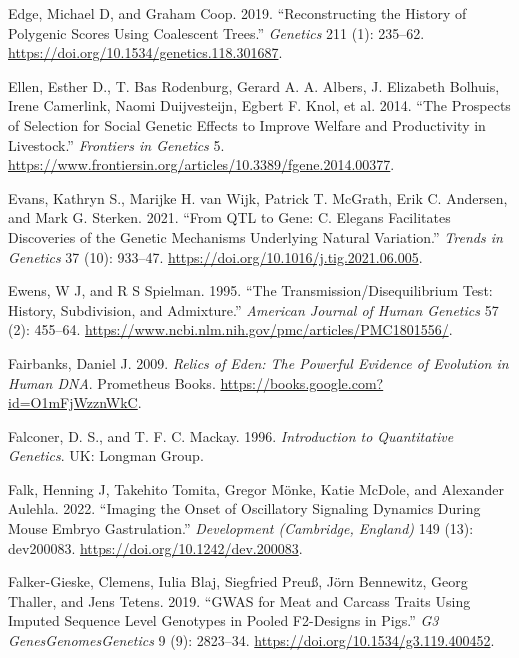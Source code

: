 \documentclass[
]{book}
\newlength{\cslhangindent}
\newlength{\cslentryspacingunit} %
\newenvironment{CSLReferences}[2] %
 {%
  \setlength{\parindent}{0pt}
  \ifodd #1
  \let\oldpar\par
  \def\par{\hangindent=\cslhangindent\oldpar}
  \fi
  \setlength{\parskip}{#2\cslentryspacingunit}
 }%
 {}
\begin{document}
\begin{CSLReferences}{1}{0}
\leavevmode{}%
Edge, Michael D, and Graham Coop. 2019. {``Reconstructing the {History} of {Polygenic Scores Using Coalescent Trees}.''} \emph{Genetics} 211 (1): 235--62. \url{https://doi.org/10.1534/genetics.118.301687}.

\leavevmode{}%
Ellen, Esther D., T. Bas Rodenburg, Gerard A. A. Albers, J. Elizabeth Bolhuis, Irene Camerlink, Naomi Duijvesteijn, Egbert F. Knol, et al. 2014. {``The Prospects of Selection for Social Genetic Effects to Improve Welfare and Productivity in Livestock.''} \emph{Frontiers in Genetics} 5. \url{https://www.frontiersin.org/articles/10.3389/fgene.2014.00377}.

\leavevmode{}%
Evans, Kathryn S., Marijke H. van Wijk, Patrick T. McGrath, Erik C. Andersen, and Mark G. Sterken. 2021. {``From {QTL} to Gene: {C}. Elegans Facilitates Discoveries of the Genetic Mechanisms Underlying Natural Variation.''} \emph{Trends in Genetics} 37 (10): 933--47. \url{https://doi.org/10.1016/j.tig.2021.06.005}.

\leavevmode{}%
Ewens, W J, and R S Spielman. 1995. {``The Transmission/Disequilibrium Test: History, Subdivision, and Admixture.''} \emph{American Journal of Human Genetics} 57 (2): 455--64. \url{https://www.ncbi.nlm.nih.gov/pmc/articles/PMC1801556/}.

\leavevmode{}%
Fairbanks, Daniel J. 2009. \emph{Relics of {Eden}: {The Powerful Evidence} of {Evolution} in {Human DNA}}. {Prometheus Books}. \url{https://books.google.com?id=O1mFjWzznWkC}.

\leavevmode{}%
Falconer, D. S., and T. F. C. Mackay. 1996. \emph{Introduction to Quantitative Genetics}. {UK: Longman Group}.

\leavevmode{}%
Falk, Henning J, Takehito Tomita, Gregor Mönke, Katie McDole, and Alexander Aulehla. 2022. {``Imaging the Onset of Oscillatory Signaling Dynamics During Mouse Embryo Gastrulation.''} \emph{Development (Cambridge, England)} 149 (13): dev200083. \url{https://doi.org/10.1242/dev.200083}.

\leavevmode{}%
Falker-Gieske, Clemens, Iulia Blaj, Siegfried Preuß, Jörn Bennewitz, Georg Thaller, and Jens Tetens. 2019. {``{GWAS} for {Meat} and {Carcass Traits Using Imputed Sequence Level Genotypes} in {Pooled F2-Designs} in {Pigs}.''} \emph{G3 Genes\textbar Genomes\textbar Genetics} 9 (9): 2823--34. \url{https://doi.org/10.1534/g3.119.400452}.


\end{CSLReferences}
\end{document}
